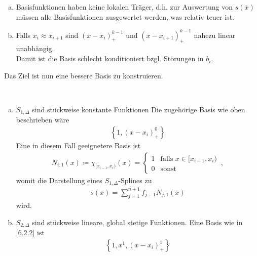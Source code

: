 

\begin{enumerate}[a)]
\item Basisfunktionen haben keine lokalen Träger,
  d.h. zur Auswertung von $s(\overline{x})$ müssen
  alle Basisfunktionen ausgewertet werden, was relativ teuer ist.
\item Falls $x_i\approx x_{i+1}$ sind 
  $(x-x_i)_+^{k-1}$ und $(x-x_{i+1})_+^{k-1}$
  nahezu linear unabhängig.\\
  Damit ist die Basis schlecht konditioniert bzgl. Störungen in $b_i$.
\end{enumerate}

Das Ziel ist nun eine bessere Basis zu konstruieren.

\begin{Bspe}~
  \begin{enumerate}[a)]
  \item {}
    $S_{1,\Delta}$ sind stückweise konstante Funktionen
    \label{im6.2.4(1)}
    Die zugehörige Basis wie oben beschrieben wäre
    \begin{gather*}
      \left\{ 1,(x-x_i)_+^0\right\}
    \end{gather*}
    Eine in diesem Fall geeignetere Basis ist
    \begin{gather*}
      N_{i,1} (x)\coloneqq \chi_{[x_{i-1},x_i)}(x)
      = \begin{cases}
        1 & \text{falls } x\in[x_{i-1},x_i)\\
        0 & \text{sonst}
      \end{cases}\, ,
    \end{gather*}
    womit die Darstellung eines $S_{1,\Delta}$-Splines zu 
    \begin{gather*}
      s(x) = \sum_{j=1}^{n+1} f_{j-1} N_{j,1}(x)
    \end{gather*}
    wird.
  \item {} $S_{2,\Delta}$ sind stückweise lineare, global stetige
    Funktionen. Eine Basis wie in \ref{6.2.2} ist
    \begin{gather*}
      \left\{1,x^1, (x-x_i)_+^1\right\}
    \end{gather*}
    \label{im6.2.4(2)}

\end{enumerate}
\end{Bspe}
